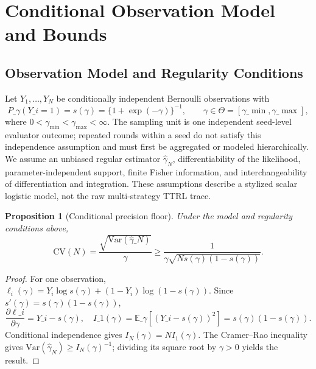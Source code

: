 \documentclass[11pt]{article}
\newtheorem{proposition}{Proposition}
\begin{document}
\section{Conditional Observation Model and Bounds}

\subsection{Observation Model and Regularity Conditions}

Let $Y_1,\ldots,Y_N$ be conditionally independent Bernoulli observations with
\[
P\_\gamma(Y\_i=1)=s(\gamma)=\{1+\exp(-\gamma)\}^{-1},
\qquad \gamma\in\Theta=[\gamma\_{\min},\gamma\_{\max}],
\]
where $0<\gamma_{\min}<\gamma_{\max}<\infty$. The sampling unit is one independent seed-level evaluator outcome; repeated rounds within a seed do not satisfy this independence assumption and must first be aggregated or modeled hierarchically. We assume an unbiased regular estimator $\hat\gamma_N$, differentiability of the likelihood, parameter-independent support, finite Fisher information, and interchangeability of differentiation and integration. These assumptions describe a stylized scalar logistic model, not the raw multi-strategy TTRL trace.

\begin{proposition}[Conditional precision floor]\label{thm:coupling-precision}
Under the model and regularity conditions above,
\[
\mathrm{CV}(N)=\frac{\sqrt{\mathrm{Var}(\hat\gamma\_N)}}{\gamma}
\geq \frac{1}{\gamma\sqrt{N s(\gamma)(1-s(\gamma))}}.
\]
\end{proposition}

\begin{proof}
For one observation, $\ell_i(\gamma)=Y_i\log s(\gamma)+(1-Y_i)\log(1-s(\gamma))$. Since $s'(\gamma)=s(\gamma)(1-s(\gamma))$,
\[
\frac{\partial\ell\_i}{\partial\gamma}=Y\_i-s(\gamma),
\quad I\_1(\gamma)=\mathbb{E}\_\gamma[(Y\_i-s(\gamma))^2]=s(\gamma)(1-s(\gamma)).
\]
Conditional independence gives $I_N(\gamma)=NI_1(\gamma)$. The Cramer--Rao inequality~\cite{lehmann1998theory} gives $\mathrm{Var}(\hat\gamma_N)\ge I_N(\gamma)^{-1}$; dividing its square root by $\gamma>0$ yields the result.
\end{proof}
\end{document}
